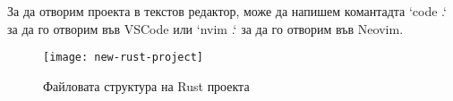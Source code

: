 За да отворим проекта в текстов редактор, може да напишем комантадта `code .` за
да го отворим във VSCode или `nvim .` за да го отворим във Neovim.
 
\begin{figure}[!htb]
  \texttt{[image: new-rust-project]}
  \centering
  \caption{Файловата структура на Rust проекта}
  \label{fig:new-rust-project}
\end{figure}



